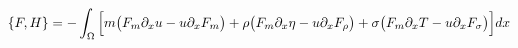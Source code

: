 \documentclass[preview]{standalone}
\newcommand{\dx}{\partial_x}
\begin{document}
\begin{align*}
\special{dvisvgm:raw <g id='unique000'>}\{F,H\}=-\int_\Omega\Big[m\big(F_m\dx u-u\dx F_m\big)+\rho\big(F_m\dx\eta-u\dx F_\rho\big)+\sigma\big(F_m\dx T-u\dx F_\sigma\big)\Big]dx\special{dvisvgm:raw </g>}
\end{align*}
\end{document}
